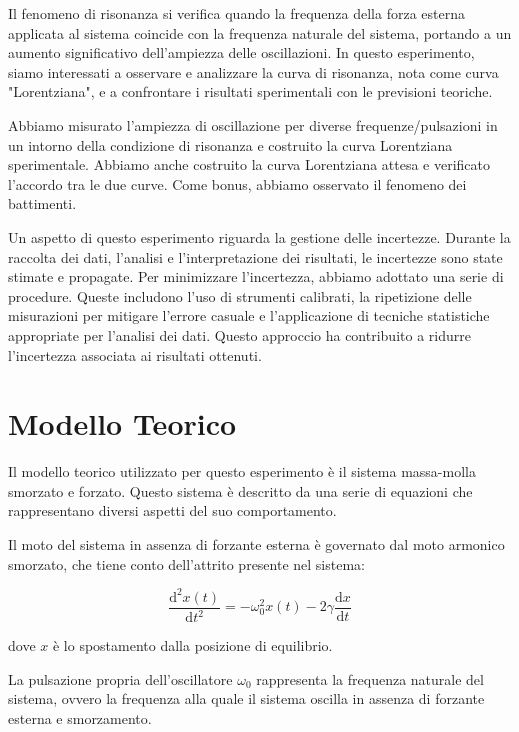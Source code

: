 \documentclass[12pt]{article}
\begin{document}
Il fenomeno di risonanza si verifica quando la frequenza della forza esterna applicata al sistema coincide con la frequenza naturale del sistema, portando a un aumento significativo dell'ampiezza delle oscillazioni. In questo esperimento, siamo interessati a osservare e analizzare la curva di risonanza, nota come curva "Lorentziana", e a confrontare i risultati sperimentali con le previsioni teoriche.

Abbiamo misurato l'ampiezza di oscillazione per diverse frequenze/pulsazioni in un intorno della condizione di risonanza e costruito la curva Lorentziana sperimentale. Abbiamo anche costruito la curva Lorentziana attesa e verificato l'accordo tra le due curve. Come bonus, abbiamo osservato il fenomeno dei battimenti.

Un aspetto di questo esperimento riguarda la gestione delle incertezze. Durante la raccolta dei dati, l'analisi e l'interpretazione dei risultati, le incertezze sono state stimate e propagate. Per minimizzare l'incertezza, abbiamo adottato una serie di procedure. Queste includono l'uso di strumenti calibrati, la ripetizione delle misurazioni per mitigare l'errore casuale e l'applicazione di tecniche statistiche appropriate per l'analisi dei dati. Questo approccio ha contribuito a ridurre l'incertezza associata ai risultati ottenuti.


\section{Modello Teorico}

Il modello teorico utilizzato per questo esperimento è il sistema massa-molla smorzato e forzato. Questo sistema è descritto da una serie di equazioni che rappresentano diversi aspetti del suo comportamento.

Il moto del sistema in assenza di forzante esterna è governato dal moto armonico smorzato, che tiene conto dell'attrito presente nel sistema:

\[
  {\frac{\mathrm{d^2}x(t)}{\mathrm{d}t^2}}=-\omega_0^2x(t)-2\gamma\frac{\mathrm{d} x}{\mathrm{d}t}
\]

dove $x$ è lo spostamento dalla posizione di equilibrio.

La pulsazione propria dell'oscillatore $\omega_0$ rappresenta la frequenza naturale del sistema, ovvero la frequenza alla quale il sistema oscilla in assenza di forzante esterna e smorzamento.
\end{document}
